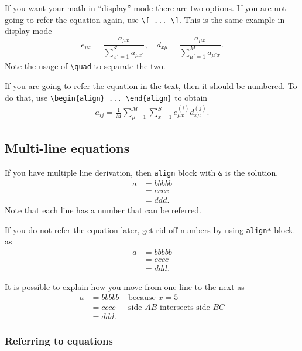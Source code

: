 \documentclass[10pt,journal,compsoc]{IEEEtran}
\newcommand{\hCode}[1]{\texttt{{\footnotesize #1}}}
\theoremstyle{plain}
\theoremstyle{definition}
\theoremstyle{remark}
\begin{document}
{If you want your math in ``display'' mode there are two options. 
If you are not going to refer the equation again, 
use \verb!\[ ... \]!.
This is the same example in display mode
\[
	e_{\mu x} 
	= \frac{a_{\mu x}}{\sum_{x'=1}^{S} a_{\mu x'}},
	\quad
	d_{x \mu} 
	= \frac{a_{\mu x}}{\sum_{\mu'=1}^{M} a_{\mu'x}}.
\]
Note the usage of \verb!\quad! to separate the two.

If you are going to refer the equation in the text,
then it should be numbered.
To do that,
use \verb!\begin{align} ... \end{align}! to obtain
\begin{align}
	a_{ij} =
		\frac{1}{M}
		\sum_{\mu = 1}^{M} 
		{\sum_{x = 1}^{S} 
			e_{\mu x}^{(i)}
			d_{x \mu}^{(j)} }.
	\label{eq:aij}
\end{align}




\subsection{Multi-line equations}

If you have multiple line derivation,
then \hCode{align} block with \verb!&! is the solution.
\begin{align}
	a 
	&= bbbbb\\
	&= cccc \label{eq:cccc}\\
	&= ddd.
\end{align}
Note that each line has a number that can be referred.

If you do not refer the equation later,
get rid off numbers by using \hCode{align*} block.
as
\begin{align*}
	a 
	&= bbbbb\\
	&= cccc\\
	&= ddd.
\end{align*}

It is possible to explain how you move from one line to the next as 
\begin{align*}
	a 
	&= bbbbb
		&\text{ because } x = 5\\
	&= cccc
		&\text{ side $AB$ intersects side $BC$}\\
	&= ddd.
\end{align*}




\subsubsection{Referring to equations}

}
\end{document}
